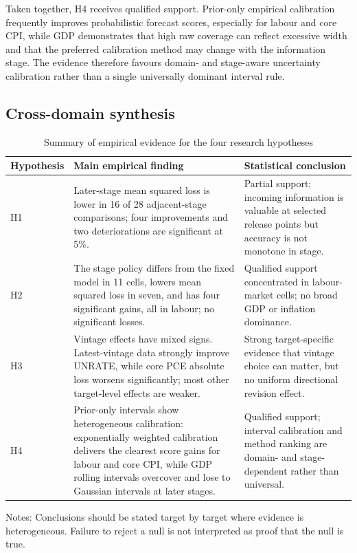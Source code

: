 Taken together, H4 receives qualified support.  Prior-only empirical
calibration frequently improves probabilistic forecast scores, especially
for labour and core CPI, while GDP demonstrates that high raw coverage can
reflect excessive width and that the preferred calibration method may change
with the information stage.  The evidence therefore favours
domain- and stage-aware uncertainty calibration rather than a single
universally dominant interval rule.

\subsection{Cross-domain synthesis}
\label{subsec:cross_domain_results}
\begin{table}[H]
\centering
\caption{Summary of empirical evidence for the four research hypotheses}
\label{tab:hypothesis_summary}
\begin{threeparttable}
\scriptsize
\setlength{\tabcolsep}{2.5pt}
\begin{tabular}{l>{\raggedright\arraybackslash}p{}>{\raggedright\arraybackslash}p{}}
\toprule
Hypothesis & Main empirical finding & Statistical conclusion \\
\midrule
H1 & Later-stage mean squared loss is lower in 16 of 28 adjacent-stage comparisons; four improvements and two deteriorations are significant at 5\%. & Partial support; incoming information is valuable at selected release points but accuracy is not monotone in stage. \\
H2 & The stage policy differs from the fixed model in 11 cells, lowers mean squared loss in seven, and has four significant gains, all in labour; no significant losses. & Qualified support concentrated in labour-market cells; no broad GDP or inflation dominance. \\
H3 & Vintage effects have mixed signs. Latest-vintage data strongly improve UNRATE, while core PCE absolute loss worsens significantly; most other target-level effects are weaker. & Strong target-specific evidence that vintage choice can matter, but no uniform directional revision effect. \\
H4 & Prior-only intervals show heterogeneous calibration: exponentially weighted calibration delivers the clearest score gains for labour and core CPI, while GDP rolling intervals overcover and lose to Gaussian intervals at later stages. & Qualified support; interval calibration and method ranking are domain- and stage-dependent rather than universal. \\
\bottomrule
\end{tabular}
\begin{tablenotes}[flushleft]\footnotesize
\item Notes: Conclusions should be stated target by target where evidence is heterogeneous. Failure to reject a null is not interpreted as proof that the null is true.
\end{tablenotes}
\end{threeparttable}
\end{table}
